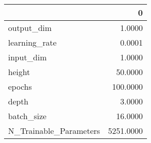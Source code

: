 \begin{tabular}{lr}
\toprule
{} &          0 \\
\midrule
output\_dim             &     1.0000 \\
learning\_rate          &     0.0001 \\
input\_dim              &     1.0000 \\
height                 &    50.0000 \\
epochs                 &   100.0000 \\
depth                  &     3.0000 \\
batch\_size             &    16.0000 \\
N\_Trainable\_Parameters &  5251.0000 \\
\bottomrule
\end{tabular}
